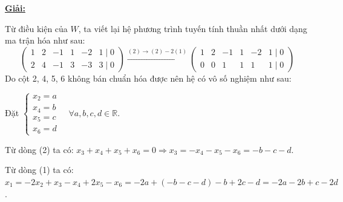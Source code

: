\documentclass[12pt,a4paper]{article}
\newcommand{\R}{\mathbb{R}}
\begin{document}
\underline{\textbf{Giải:}}

Từ điều kiện của $W$, ta viết lại hệ phương trình tuyến tính thuần nhất dưới dạng ma trận hóa như sau:
\[
\begin{pmatrix} 
1 & 2 & -1 & 1 & -2 & 1 \mid 0 \\ 
2 & 4 & -1 & 3 & -3 & 3 \mid 0 
\end{pmatrix}
\xrightarrow{(2) \to (2) - 2(1)}
\begin{pmatrix} 
1 & 2 & -1 & 1 & -2 & 1 \mid 0 \\ 
0 & 0 & 1 & 1 & 1 & 1 \mid 0 
\end{pmatrix}
\]
Do cột 2, 4, 5, 6 không bán chuẩn hóa được nên hệ có vô số nghiệm như sau:

Đặt $\begin{cases} x_2 = a \\ x_4 = b \\ x_5 = c \\ x_6 = d \end{cases} \quad \forall a, b, c, d \in \R$.

Từ dòng (2) ta có: $x_3 + x_4 + x_5 + x_6 = 0 \Rightarrow x_3 = -x_4 - x_5 - x_6 = -b - c - d$.

Từ dòng (1) ta có: $x_1 = -2x_2 + x_3 - x_4 + 2x_5 - x_6 = -2a + (-b - c - d) - b + 2c - d = -2a - 2b + c - 2d$.
\end{document}
